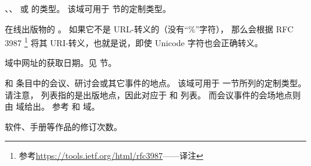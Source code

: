 \begin{fieldlist}
、、 或  的类型。
该域可用于  节的定制类型。




在线出版物的 。
如果它不是 URL-转义的（没有“\%”字符），
那么会根据 RFC 3987 \footnote{
	参考\url{https://tools.ietf.org/html/rfc3987}——译注}
将其 URI-转义，也就是说，即使 Unicode 字符也会正确转义。




 域中网址的获取日期。见  节。




 和  条目中的会议、研讨会或其它事件的地点。
该域可用于  一节所列的定制类型。
请注意， 列表指的是出版地点，因此对应于  和  列表。
而会议事件的会场地点则由  域给出。
参考  和  域。




软件、手册等作品的修订次数。



\end{fieldlist}
